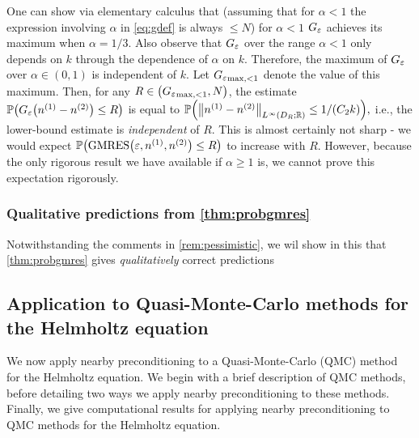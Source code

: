 One can show via elementary calculus that (assuming that for $\alpha < 1$ the expression involving $\alpha$ in \cref{eq:gdef} is always $\leq N$) for $\alpha < 1$ $G_{\varepsilon}$ achieves its maximum when $\alpha = 1/3$. Also observe that $G_{\varepsilon}$ over the range $\alpha < 1$ only depends on $k$ through the dependence of $\alpha$ on $k.$ Therefore, the maximum of $G_{\varepsilon}$ over $\alpha \in (0,1)$ is independent of $k.$ Let ${G_{\varepsilon}}_{\max,<1}$ denote the value of this maximum. Then, for any $R \in \mleft(\Gfnmaxlo,N\mright)$, the estimate $\PP\mleft(\Gfn{\nso-\nst} \leq R\mright)$ is equal to $\PP\mleft(\NLiDRRR{\nso-\nst} \leq 1/\mleft(\Ct k\mright)\mright),$ i.e., the lower-bound estimate is \emph{independent} of $R$. This is almost certainly not sharp - we would expect $\PP\mleft(\GMRES{\eps}{\nso}{\nst} \leq R\mright)$ to increase with $R$. However, because the only rigorous result we have available if $\alpha \geq 1$ is, we cannot prove this expectation rigorously.
\ere

\subsubsection{Qualitative predictions from \cref{thm:probgmres}}\label{sec:qualgmres}

Notwithstanding the comments in \cref{rem:pessimistic}, we wil show in this  that \cref{thm:probgmres} gives \emph{qualitatively} correct predictions 










\subsection{Application to Quasi-Monte-Carlo methods for the Helmholtz equation}\label{sec:nbpcqmc}

We now apply nearby preconditioning to a Quasi-Monte-Carlo (QMC) method for the Helmholtz equation. We begin with a brief description of QMC methods, before detailing two ways we apply nearby preconditioning to these methods. Finally, we give computational results for applying nearby preconditioning to QMC methods for the Helmholtz equation.

